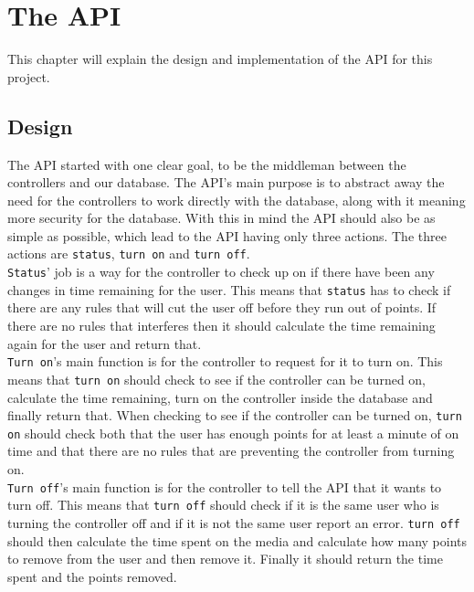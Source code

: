 \chapter{The API}
This chapter will explain the design and implementation of the API for this project.
\section{Design}
The API started with one clear goal, to be the middleman between the controllers and our database. The API's main purpose is to abstract away the need for the controllers to work directly with the database, along with it meaning more security for the database. With this in mind the API should also be as simple as possible, which lead to the API having only three actions. The three actions are \texttt{status}, \texttt{turn on} and \texttt{turn off}. \\
\texttt{Status}' job is a way for the controller to check up on if there have been any changes in time remaining for the user. This means that \texttt{status} has to check if there are any rules that will cut the user off before they run out of points. If there are no rules that interferes then it should calculate the time remaining again for the user and return that. \\
\texttt{Turn on}'s main function is for the controller to request for it to turn on. This means that \texttt{turn on} should check to see if the controller can be turned on, calculate the time remaining, turn on the controller inside the database and finally return that. When checking to see if the controller can be turned on, \texttt{turn on} should check both that the user has enough points for at least a minute of on time and that there are no rules that are preventing the controller from turning on. \\
\texttt{Turn off}'s main function is for the controller to tell the API that it wants to turn off. This means that \texttt{turn off} should check if it is the same user who is turning the controller off and if it is not the same user report an error. \texttt{turn off} should then calculate the time spent on the media and calculate how many points to remove from the user and then remove it. Finally it should return the time spent and the points removed.


